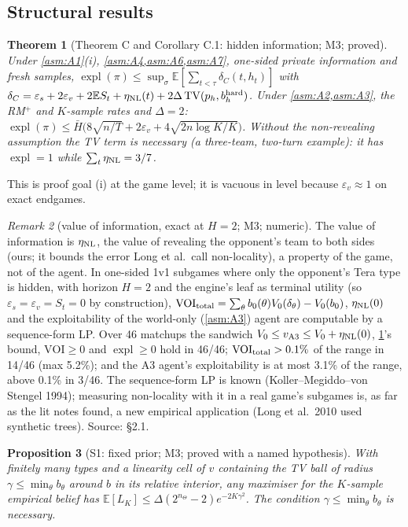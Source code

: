 \documentclass[10pt]{article}
\theoremstyle{plain}
\newtheorem{theorem}{Theorem}
\newtheorem{proposition}[theorem]{Proposition}
\theoremstyle{definition}
\theoremstyle{remark}
\newtheorem{remark}[theorem]{Remark}
\newcommand{\E}{\mathbb{E}}
\DeclareMathOperator{\expl}{expl}
\DeclareMathOperator{\TV}{TV}
\newcommand{\epss}{\varepsilon_s}
\newcommand{\epsv}{\varepsilon_v}
\newcommand{\Hbar}{\bar H}
\newcommand{\src}[1]{\path{#1}}
\begin{document}
\subsection{Structural results}\label{sec:struct}

\begin{theorem}[Theorem C and Corollary C.1: hidden information; M3; proved]\label{thm:C}
Under \cref{asm:A1}(i), \cref{asm:A4,asm:A6,asm:A7}, one-sided private information and fresh samples,
$\expl(\pi)\le\sup_\sigma\E[\sum_{t<\tau}\delta_C(t,h_t)]$ with
$\delta_C=\epss+2\epsv+2\E S_t+\eta_{\rm NL}(t)+2\Delta\TV(p_h,b^{\rm hard}_h)$. Under \cref{asm:A2,asm:A3}, the RM$^+$ and
$K$-sample rates and $\Delta=2$: $\expl(\pi)\le\Hbar\big(8\sqrt{n/T}+2\epsv+4\sqrt{2n\log K/K}\big)$. Without the non-revealing assumption the TV term is
necessary (a three-team, two-turn example): it has $\expl=1$ while $\sum_t\eta_{\rm NL}=3/7$.
\end{theorem}
This is proof goal (i) at the game level; it is vacuous in level because $\epsv\approx1$ on exact endgames.
\begin{remark}[value of information, exact at $H=2$; M3; numeric]\label{rem:voi}
The value of information is $\eta_{\rm NL}$, the value of revealing the opponent's team to both sides (ours; it bounds the error Long et al.\ call non-locality), a property of the game, not of the agent. In one-sided 1v1 subgames where
only the opponent's Tera type is hidden, with horizon $H=2$ and the engine's leaf as terminal utility (so $\epss=\epsv=S_t=0$
by construction), $\mathrm{VOI}_{\rm total}=\sum_\theta b_0(\theta)V_0(\delta_\theta)-V_0(b_0)$, $\eta_{\rm NL}(0)$ and the exploitability of the
world-only (\cref{asm:A3}) agent are computable by a sequence-form LP. Over 46 matchups the sandwich
$V_0\le v_{\rm A3}\le V_0+\eta_{\rm NL}(0)$, \cref{thm:C}'s bound, $\mathrm{VOI}\ge0$ and $\expl\ge0$ hold in 46/46;
$\mathrm{VOI}_{\rm total}>0.1\%$ of the range in 14/46 (max 5.2\%); and the A3 agent's exploitability is at most 3.1\% of the
range, above 0.1\% in 3/46. The sequence-form LP is known (Koller--Megiddo--von Stengel 1994); measuring non-locality
with it in a real game's subgames is, as far as the lit notes found, a new empirical application (Long et al.\ 2010
used synthetic trees). Source: \src{theory/tightening/voi.md} \S2.1.
\end{remark}
\begin{proposition}[S1: fixed prior; M3; proved with a named hypothesis]\label{prop:S1}
With finitely many types and a linearity cell of $v$ containing the TV ball of radius $\gamma\le\min_\theta b_\theta$
around $b$ in its relative interior, any maximiser for the $K$-sample empirical belief has
$\E[L_K]\le\Delta(2^{n_\Theta}-2)e^{-2K\gamma^2}$. The condition $\gamma\le\min_\theta b_\theta$ is necessary.
\end{proposition}
\end{document}
